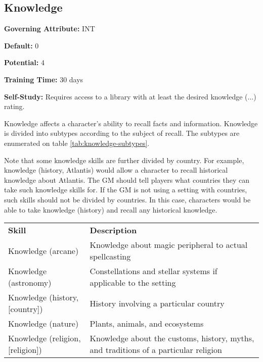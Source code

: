 \subsection{Knowledge}\label{skill:knowledge}

\noindent
\textbf{Governing Attribute:} INT

\noindent
\textbf{Default:} 0

\noindent
\textbf{Potential:} 4

\noindent
\textbf{Training Time:} 30 days

\noindent
\textbf{Self-Study:} Requires access to a library with at least the desired
knowledge (...) rating.


Knowledge affects a character's ability to recall facts and information.
Knowledge is divided into subtypes according to the subject of recall. The
subtypes are enumerated on table \ref{tab:knowledge-subtypes}.

Note that some knowledge skills are further divided by country. For example,
knowledge (history, Atlantis) would allow a character to recall historical
knowledge about Atlantis. The GM should tell players what countries they can
take such knowledge skills for. If the GM is not using a setting with
countries, such skills should not be divided by countries. In this case,
characters would be able to take knowledge (history) and recall any historical
knowledge.

\begin{center}
    \unclassedrowcolors
    \begin{tabularx}{0.5\textwidth}{X X}
        \textbf{Skill} & \textbf{Description} \\
        Knowledge (arcane) & Knowledge about magic peripheral to actual spellcasting \\
        Knowledge (astronomy) & Constellations and stellar systems if applicable to the setting \\
        Knowledge (history, [country]) & History involving a particular country \\
        Knowledge (nature) & Plants, animals, and ecosystems \\
        Knowledge (religion, [religion]) & Knowledge about the customs, history, myths, and traditions of a particular religion \\
    \end{tabularx}
    \label{tab:knowledge-subtypes}
\end{center}

